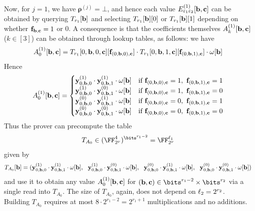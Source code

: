 \documentclass[11pt,letterpaper,usenames,dvipsnames]{article}
\begin{document}
%
Now, for $j=1$, we have $\bm{\rho}^{(j)}= \bot$, and hence each value $E_{\varepsilon_1\varepsilon_2}^{(1)}[\mathbf{b},\mathbf{c}]$ can be obtained by querying $T_{r_1}[\mathbf{b}]$ and selecting $T_{r_1}[\mathbf{b}][0]$ or $T_{r_1}[\mathbf{b}][1]$  depending on whether $\mathbf{f}_{\mathbf{b},\mathbf{c}} = 1$ or $0$. A consequence  is that  the coefficients themselves $A_k^{(1)}[\mathbf{b},\mathbf{c}]$ ($k\in [3]$) can be obtained through lookup tables, as follows:
%
 we have $$A_0^{(1)}[\mathbf{b},\mathbf{c}] = 
    T_{r_1}[0,\mathbf{b},0,\mathbf{c}][\mathbf{f}_{(0,\mathbf{b},0),\mathbf{c}}] \cdot    T_{r_1}[0,\mathbf{b}, 1,\mathbf{c}][\mathbf{f}_{(0,\mathbf{b},1),\mathbf{c}}] \cdot \omega[\mathbf{b}]
$$
Hence
%
$$
A_0^{(1)}[\bb,\cc] = \begin{cases}
    \yy_{0,\bb,0}^{(1)} \cdot  \yy_{0,\bb,1}^{(1)} \cdot \omega[\bb]&\text{if } \bff_{(0,\bb,0),\cc}=1,\ \bff_{(0,\bb,1),\cc}=1 \\  
    \yy_{0,\bb,0}^{(1)} \cdot  \yy_{0,\bb,1}^{(0)}\cdot \omega[\bb]&\text{if } \bff_{(0,\bb,0),\cc}=1,\ \bff_{(0,\bb,1),\cc}=0\\
     \yy_{0,\bb,0}^{(0)} \cdot  \yy_{0,\bb,1}^{(1)}\cdot \omega[\bb]& \text{if } \bff_{(0,\bb,0),\cc}=0,\ \bff_{(0,\bb,1),\cc}=1 \\
    \yy_{0,\bb,0}^{(0)} \cdot  \yy_{0,\bb,1}^{(0)} \cdot  \omega[\bb] &\text{if } \bff_{(0,\bb,0),\cc}= 0,\  \bff_{(0,\bb,1),\cc}=0
\end{cases}
$$
%
Thus the prover can precompute the table $$T_{A_0} \in (\comfield^{4})^{\bits^{r_1-2}}=\comfield^{\codedim_1}$$ given by $$T_{A_0}[\bb]=(\yy_{0,\bb,0}^{(1)} \cdot  \yy_{0,\bb,1}^{(1)} \cdot \omega[\bb],  \ \
    \yy_{0,\bb,0}^{(1)} \cdot  \yy_{0,\bb,1}^{(0)}\cdot \omega[\bb],   \ \ \yy_{0,\bb,0}^{(0)} \cdot  \yy_{0,\bb,1}^{(1)}\cdot \omega[\bb],   \ \ \yy_{0,\bb,0}^{(0)} \cdot  \yy_{0,\bb,1}^{(0)} \cdot  \omega[\bb])$$
and use it to obtain any value $A_{0}^{(1)}[\mathbf{b},\mathbf{c}]$ for $(\bb,\cc)\in \bits^{r_1-2}\times \bits^{r_2}$ via a single read into $T_{A_0}$. %
%
The size of $T_{A_0}$, again, does not depend on $\ell_2=2^{r_2}$. Building $T_{A_0}$ requires at most $8\cdot 2^{r_1-2} = 2^{r_1+1}$ multiplications and no additions. 
\end{document}
